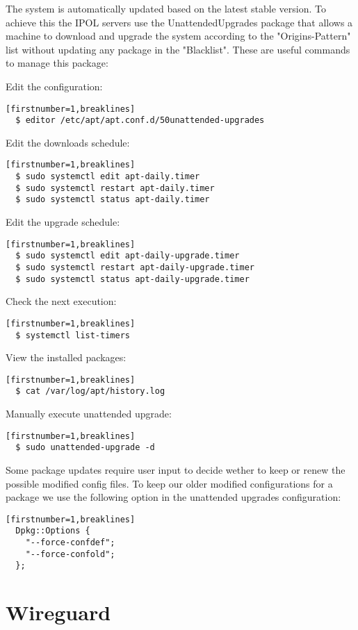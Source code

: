 \documentclass[a4paper,12pt]{article}
\begin{document}
The system is automatically updated based on the latest stable version. To achieve this the IPOL servers use the UnattendedUpgrades package that allows a machine to download and upgrade the system according to the "Origins-Pattern" list without updating any package in the "Blacklist". These are useful commands to manage this package: 

Edit the configuration: 
\begin{verbatim}[firstnumber=1,breaklines]
  $ editor /etc/apt/apt.conf.d/50unattended-upgrades
\end{verbatim}

Edit the downloads schedule: 
\begin{verbatim}[firstnumber=1,breaklines]
  $ sudo systemctl edit apt-daily.timer
  $ sudo systemctl restart apt-daily.timer
  $ sudo systemctl status apt-daily.timer
\end{verbatim}

Edit the upgrade schedule: 
\begin{verbatim}[firstnumber=1,breaklines]
  $ sudo systemctl edit apt-daily-upgrade.timer
  $ sudo systemctl restart apt-daily-upgrade.timer
  $ sudo systemctl status apt-daily-upgrade.timer
\end{verbatim}

Check the next execution: 
\begin{verbatim}[firstnumber=1,breaklines]
  $ systemctl list-timers
\end{verbatim}

View the installed packages: 
\begin{verbatim}[firstnumber=1,breaklines]
  $ cat /var/log/apt/history.log
\end{verbatim}

Manually execute unattended upgrade:
\begin{verbatim}[firstnumber=1,breaklines]
  $ sudo unattended-upgrade -d
\end{verbatim}

Some package updates require user input to decide wether to keep or renew the possible modified config files. To keep our older modified configurations for a package we use the following option in the unattended upgrades configuration:

\begin{verbatim}[firstnumber=1,breaklines]
  Dpkg::Options {
    "--force-confdef";
    "--force-confold";
  };
\end{verbatim}


\section{Wireguard}
\end{document}
